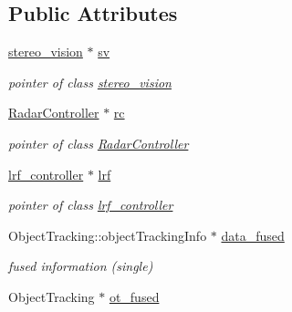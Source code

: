 \subsection*{Public Attributes}
\begin{DoxyCompactItemize}
\item 
\hypertarget{class_sensor_info_a4e3f1250f396a7229a9d2195429ab95c}{}\hyperlink{classstereo__vision}{stereo\+\_\+vision} $\ast$ \hyperlink{class_sensor_info_a4e3f1250f396a7229a9d2195429ab95c}{sv}\label{class_sensor_info_a4e3f1250f396a7229a9d2195429ab95c}

\begin{DoxyCompactList}\small\item\em pointer of class \hyperlink{classstereo__vision}{stereo\+\_\+vision} \end{DoxyCompactList}\item 
\hypertarget{class_sensor_info_a3138edb6c3a02a2c0b31a3f70afa74ba}{}\hyperlink{class_radar_controller}{Radar\+Controller} $\ast$ \hyperlink{class_sensor_info_a3138edb6c3a02a2c0b31a3f70afa74ba}{rc}\label{class_sensor_info_a3138edb6c3a02a2c0b31a3f70afa74ba}

\begin{DoxyCompactList}\small\item\em pointer of class \hyperlink{class_radar_controller}{Radar\+Controller} \end{DoxyCompactList}\item 
\hypertarget{class_sensor_info_a237508ffb14be65b71a5578da5f4e01c}{}\hyperlink{classlrf__controller}{lrf\+\_\+controller} $\ast$ \hyperlink{class_sensor_info_a237508ffb14be65b71a5578da5f4e01c}{lrf}\label{class_sensor_info_a237508ffb14be65b71a5578da5f4e01c}

\begin{DoxyCompactList}\small\item\em pointer of class \hyperlink{classlrf__controller}{lrf\+\_\+controller} \end{DoxyCompactList}\item 
\hypertarget{class_sensor_info_a75484cb15fb13e0ce29c0e9dd99d2c2b}{}Object\+Tracking\+::object\+Tracking\+Info $\ast$ \hyperlink{class_sensor_info_a75484cb15fb13e0ce29c0e9dd99d2c2b}{data\+\_\+fused}\label{class_sensor_info_a75484cb15fb13e0ce29c0e9dd99d2c2b}

\begin{DoxyCompactList}\small\item\em fused information (single) \end{DoxyCompactList}\item 
\hypertarget{class_sensor_info_aec5c17cd1b09659a924021bb58826192}{}Object\+Tracking $\ast$ \hyperlink{class_sensor_info_aec5c17cd1b09659a924021bb58826192}{ot\+\_\+fused}\label{class_sensor_info_aec5c17cd1b09659a924021bb58826192}


\end{DoxyCompactItemize}
